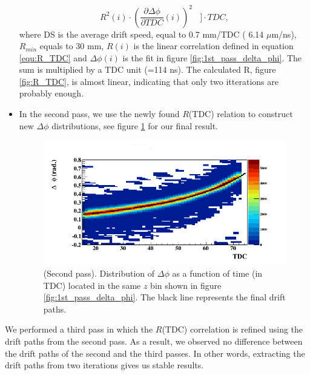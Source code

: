 \begin{itemize}
\begin{equation}
{      R^{2}(i) \cdot \left(\frac{\partial \Delta \phi}{\partial TDC}(i) 
\right)^{2}}~~~~\bigg] \cdot TDC,
 \end{equation}
where DS is the average drift speed, equal to 0.7 mm/TDC ( 6.14 $\mu$m/ns), 
$R_{min}$ equals to 30 mm, $R(i)$ is the linear correlation defined in equation 
\ref{equ:R_TDC} and $\Delta \phi (i)$ is the fit in figure 
\ref{fig:1st_pass_delta_phi}. The sum is multiplied by a TDC unit (=114 ns).  
The calculated R, figure \ref{fig:R_TDC}, is almost linear, 
indicating that only two itterations are probably enough.
\item In the second pass, we use the newly found $R$(TDC) relation to construct 
new $\Delta \phi$ distributions, see figure \ref{fig:final_drift_paths} for our final
result.
\begin{figure}[tp]
\centering
\includegraphics[scale=0.45]{fig_rtpc/FitResult_p2_10.png}
\caption{(Second pass). Distribution of $\Delta \phi$ as a function of time (in TDC) 
located in the same $z$ bin shown in figure \ref{fig:1st_pass_delta_phi}. The 
black line represents the final drift paths.}
\label{fig:final_drift_paths}
\end{figure}
\end{itemize}

We performed a third pass in which the $R$(TDC) correlation is refined using the 
drift paths from the second pass. As a 
result, we observed no difference between the drift paths of the second and the 
third passes. In other words, extracting the drift paths from two iterations 
gives us stable results. 
 
